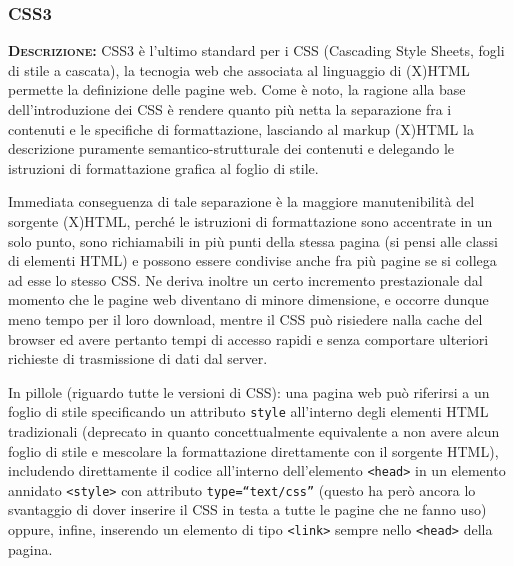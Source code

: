 \subsubsection{CSS3}
\begin{description}
	\item{\scshape\bfseries Descrizione:}
CSS3 è l'ultimo standard per i CSS (Cascading Style Sheets, fogli di stile a cascata), la tecnogia web che associata al linguaggio di (X)HTML permette la definizione delle pagine web. Come  è noto, la ragione alla base dell'introduzione dei CSS è rendere quanto più netta la separazione fra i contenuti e le specifiche di formattazione, lasciando al markup (X)HTML la descrizione puramente semantico-strutturale dei contenuti e delegando le istruzioni di formattazione grafica al foglio di stile.

Immediata conseguenza di tale separazione è la maggiore manutenibilità del sorgente (X)HTML, perché le istruzioni di formattazione sono accentrate in un solo punto, sono richiamabili in più punti della stessa pagina (si pensi alle classi di elementi HTML) e possono essere condivise anche fra più pagine se si collega ad esse lo stesso CSS\@. Ne deriva inoltre un certo incremento prestazionale dal momento che le pagine web diventano di minore dimensione, e occorre dunque meno tempo per il loro download, mentre il CSS può risiedere nalla cache del browser ed avere pertanto tempi di accesso rapidi e senza comportare ulteriori richieste di trasmissione di dati dal server.

In pillole (riguardo tutte le versioni di CSS): una pagina web può riferirsi a un foglio di stile specificando un attributo \texttt{style} all'interno degli elementi HTML tradizionali (deprecato in quanto concettualmente equivalente a non avere alcun foglio di stile e mescolare la formattazione direttamente con il sorgente HTML), includendo direttamente il codice all'interno dell'elemento \texttt{<head>} in un elemento annidato \texttt{<style>} con attributo \texttt{type=``text/css''} (questo ha però ancora lo svantaggio di dover inserire il CSS in testa a tutte le pagine che ne fanno uso) oppure, infine, inserendo un elemento di tipo \texttt{<link>} sempre nello \texttt{<head>} della pagina.


\end{description}
